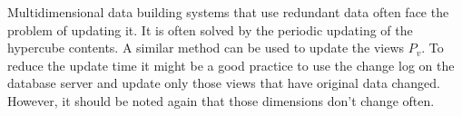 \documentclass[prodmode,acmtods]{acmsmall} %
\begin{document}
Multidimensional data building systems that use redundant data often face the
problem of updating it. It is often solved by the periodic updating of the
hypercube contents.
A similar method can be used to update the views $P_v$. To reduce the update
time it might be a good practice to use the change log on the database server
and update only those views that have original data changed. However, it should
be noted again that those dimensions don't change often.




\end{document}
